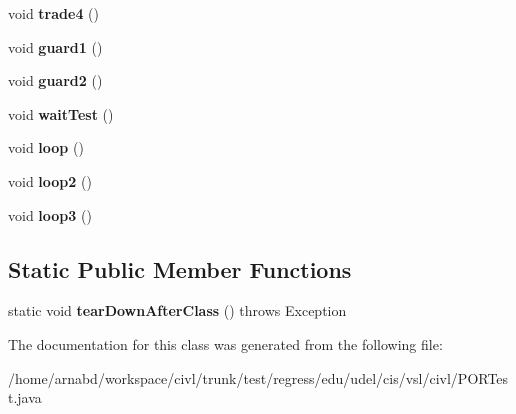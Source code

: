\begin{DoxyCompactItemize}
\item 
\hypertarget{classedu_1_1udel_1_1cis_1_1vsl_1_1civl_1_1PORTest_af8b59804f42de7f738c6732024598b64}{}void {\bfseries trade4} ()\label{classedu_1_1udel_1_1cis_1_1vsl_1_1civl_1_1PORTest_af8b59804f42de7f738c6732024598b64}

\item 
\hypertarget{classedu_1_1udel_1_1cis_1_1vsl_1_1civl_1_1PORTest_a26d635d12a2251b728af070deb32cf92}{}void {\bfseries guard1} ()\label{classedu_1_1udel_1_1cis_1_1vsl_1_1civl_1_1PORTest_a26d635d12a2251b728af070deb32cf92}

\item 
\hypertarget{classedu_1_1udel_1_1cis_1_1vsl_1_1civl_1_1PORTest_ae1c9e49208e1248cf714ff626913d8e1}{}void {\bfseries guard2} ()\label{classedu_1_1udel_1_1cis_1_1vsl_1_1civl_1_1PORTest_ae1c9e49208e1248cf714ff626913d8e1}

\item 
\hypertarget{classedu_1_1udel_1_1cis_1_1vsl_1_1civl_1_1PORTest_aee3ad464bffd7ff87cdf16c26b116be9}{}void {\bfseries wait\+Test} ()\label{classedu_1_1udel_1_1cis_1_1vsl_1_1civl_1_1PORTest_aee3ad464bffd7ff87cdf16c26b116be9}

\item 
\hypertarget{classedu_1_1udel_1_1cis_1_1vsl_1_1civl_1_1PORTest_acd2f96039024b0a8710324dcb1c40051}{}void {\bfseries loop} ()\label{classedu_1_1udel_1_1cis_1_1vsl_1_1civl_1_1PORTest_acd2f96039024b0a8710324dcb1c40051}

\item 
\hypertarget{classedu_1_1udel_1_1cis_1_1vsl_1_1civl_1_1PORTest_aa0a99f5ad3394b3035ee68d25ba46bb0}{}void {\bfseries loop2} ()\label{classedu_1_1udel_1_1cis_1_1vsl_1_1civl_1_1PORTest_aa0a99f5ad3394b3035ee68d25ba46bb0}

\item 
\hypertarget{classedu_1_1udel_1_1cis_1_1vsl_1_1civl_1_1PORTest_ae5301572b4a5ff748f4162fd7b926ebd}{}void {\bfseries loop3} ()\label{classedu_1_1udel_1_1cis_1_1vsl_1_1civl_1_1PORTest_ae5301572b4a5ff748f4162fd7b926ebd}

\end{DoxyCompactItemize}
\subsection*{Static Public Member Functions}
\begin{DoxyCompactItemize}
\item 
\hypertarget{classedu_1_1udel_1_1cis_1_1vsl_1_1civl_1_1PORTest_a672401cd49eb8c354aa60025cf534e77}{}static void {\bfseries tear\+Down\+After\+Class} ()  throws Exception \label{classedu_1_1udel_1_1cis_1_1vsl_1_1civl_1_1PORTest_a672401cd49eb8c354aa60025cf534e77}

\end{DoxyCompactItemize}


The documentation for this class was generated from the following file\+:\begin{DoxyCompactItemize}
\item 
/home/arnabd/workspace/civl/trunk/test/regress/edu/udel/cis/vsl/civl/P\+O\+R\+Test.\+java\end{DoxyCompactItemize}
